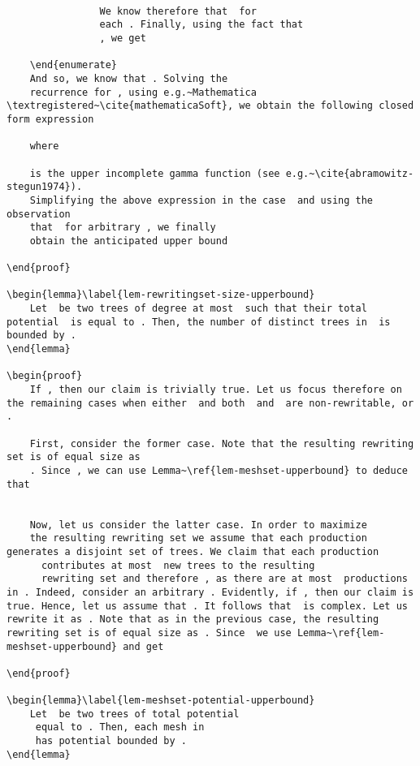 \documentclass[11pt,a4paper]{amsart}
\theoremstyle{definition}
\newtheorem{lemma}[theorem]{Lemma}
\begin{document}
\begin{lstlisting}
                
				We know therefore that  for 
				each . Finally, using the fact that 
				, we get
				
    \end{enumerate}
    And so, we know that . Solving the
    recurrence for , using e.g.~Mathematica \textregistered~\cite{mathematicaSoft}, we obtain the following closed form expression
    
    where
    
    is the upper incomplete gamma function (see e.g.~\cite{abramowitz-stegun1974}).
    Simplifying the above expression in the case  and using the observation
    that  for arbitrary , we finally
    obtain the anticipated upper bound
    
\end{proof}

\begin{lemma}\label{lem-rewritingset-size-upperbound}
    Let  be two trees of degree at most  such that their total potential  is equal to . Then, the number of distinct trees in  is bounded by .
\end{lemma}

\begin{proof}
	If , then our claim is trivially true. Let us focus therefore on the remaining cases when either  and both  and  are non-rewritable, or . 
	
	First, consider the former case. Note that the resulting rewriting set is of equal size as
    . Since , we can use Lemma~\ref{lem-meshset-upperbound} to deduce that
    
	
	Now, let us consider the latter case. In order to maximize
    the resulting rewriting set we assume that each production  generates a disjoint set of trees. We claim that each production
      contributes at most  new trees to the resulting
      rewriting set and therefore , as there are at most  productions in . Indeed, consider an arbitrary . Evidently, if , then our claim is true. Hence, let us assume that . It follows that  is complex. Let us rewrite it as . Note that as in the previous case, the resulting rewriting set is of equal size as . Since  we use Lemma~\ref{lem-meshset-upperbound} and get
      
\end{proof}

\begin{lemma}\label{lem-meshset-potential-upperbound}
    Let  be two trees of total potential
     equal to . Then, each mesh in
     has potential bounded by .
\end{lemma}


\end{lstlisting}
\end{document}
